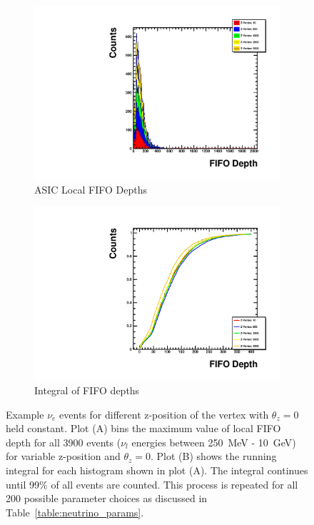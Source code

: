 \begin{figure}
\centering
\begin{subfigure}{.5\textwidth}
  \centering
  \includegraphics[width=\textwidth]{images/Const_Theta0_ASIC_stack_integral_pdg12_fhc.pdf}
  \caption{ASIC Local FIFO Depths}
\end{subfigure}%
\begin{subfigure}{.5\textwidth}
  \centering
  \includegraphics[width=\textwidth]{images/Const_Theta0_ASIC_integral_pdg12_fhc.pdf}
  \caption{Integral of FIFO depths}
\end{subfigure}
\caption{Example $\nu_{e}$ events for different z-position of the vertex with $\theta_{z} = 0$ held constant.
Plot (A) bins the maximum value of local FIFO depth for all 3900 events ($\nu_{l}$ energies between 250~\unit{MeV} - 10~\unit{GeV}) for variable z-position and $\theta_{z} = 0$.
Plot (B) shows the running integral for each histogram shown in plot (A).
The integral continues until 99\% of all events are counted.
This process is repeated for all 200 possible parameter choices as discussed in Table~\ref{table:neutrino_params}.
}
\label{fig:example_asic_integral_value_constTheta}
\end{figure}

